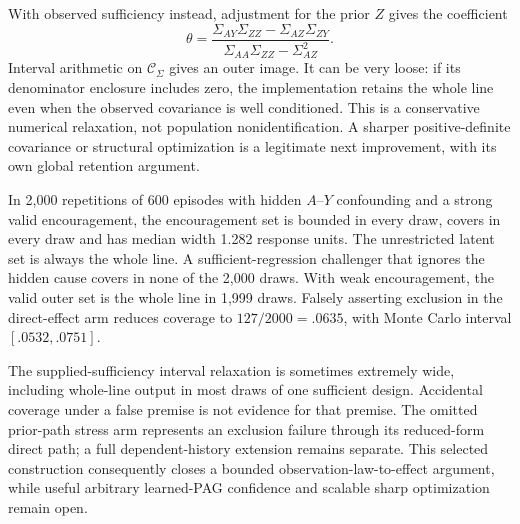 With observed sufficiency instead, adjustment for the prior $Z$ gives the
coefficient
\[
 \theta=\frac{\Sigma_{AY}\Sigma_{ZZ}-\Sigma_{AZ}\Sigma_{ZY}}
              {\Sigma_{AA}\Sigma_{ZZ}-\Sigma_{AZ}^2}.
\]
Interval arithmetic on $\mathcal C_\Sigma$ gives an outer image. It can be
very loose: if its denominator enclosure includes zero, the implementation
retains the whole line even when the observed covariance is well conditioned.
This is a conservative numerical relaxation, not population nonidentification.
A sharper positive-definite covariance or structural optimization is a
legitimate next improvement, with its own global retention argument.

In 2,000 repetitions of 600 episodes with hidden $A$--$Y$ confounding and a
strong valid encouragement, the encouragement set is bounded in every draw,
covers in every draw and has median width 1.282 response units. The
unrestricted latent set is always the whole line. A sufficient-regression
challenger that ignores the hidden cause covers in none of the 2,000 draws.
With weak encouragement, the valid outer set is the whole line in 1,999 draws.
Falsely asserting exclusion in the direct-effect arm reduces coverage to
$127/2000=.0635$, with Monte Carlo interval $[.0532,.0751]$.

The supplied-sufficiency interval relaxation is sometimes extremely wide,
including whole-line output in most draws of one sufficient design. Accidental
coverage under a false premise is not evidence for that premise. The omitted
prior-path stress arm represents an exclusion failure through its reduced-form
direct path; a full dependent-history extension remains separate. This selected
construction consequently closes a bounded observation-law-to-effect argument,
while useful arbitrary learned-PAG confidence and scalable sharp optimization
remain open.
